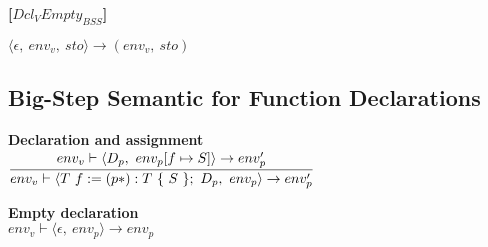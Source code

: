 \textbf{[$Dcl_V Empty_{BSS}$]}\\
\begin{center}
	\begin{math}
	\langle \epsilon,\ env_v,\ sto \rangle \rightarrow (env_v,\ sto)
	\end{math}
\end{center}















\subsection{Big-Step Semantic for Function Declarations}
\textbf{Declaration and assignment}\\
\begin{math}
	\cfrac
		{env_v \vdash \langle D_p,\ env_p[f \mapsto S] \rangle \rightarrow env_p'}
		{env_v \vdash \langle T\ f := (p*): T\ \{\ S\ \};\ D_p,\ env_p \rangle \rightarrow env_p'} %
\end{math}

\textbf{Empty declaration}\\
\begin{math}
env_v \vdash \langle \epsilon,\ env_p \rangle \rightarrow env_p
\end{math}




